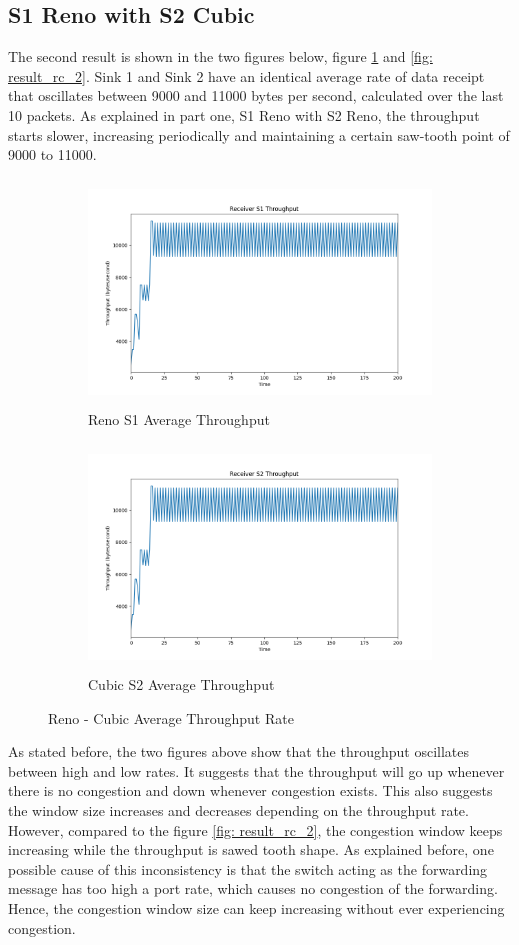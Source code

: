 \documentclass[12pt,a4paper]{report}
\begin{document}
\subsection*{S1 Reno with S2 Cubic}
The second result is shown in the two figures below, figure \ref{fig: result_rc_1} and \ref{fig: result_rc_2}.  Sink 1 and Sink 2 have an identical average rate of data receipt that oscillates between 9000 and 11000 bytes per second, calculated over the last 10 packets. As explained in part one, S1 Reno with S2 Reno, the throughput starts slower, increasing periodically and maintaining a certain saw-tooth point of 9000 to 11000. \\
\begin{figure}[!ht]
\begin{subfigure}{0.5\textwidth}
\includegraphics[width=1\linewidth, height=6cm]{Pictures/S1_Cubic_Throughput.png} 
\caption{Reno S1 Average Throughput}
\end{subfigure}
\begin{subfigure}{0.5\textwidth}
\includegraphics[width=1\linewidth, height=6cm]{Pictures/S2_Cubic_Throughput.png}
\caption{Cubic S2 Average Throughput}
\end{subfigure}
\caption{Reno - Cubic Average Throughput Rate}
\label{fig: result_rc_1}
\end{figure}
\break
\noindent As stated before, the two figures above show that the throughput oscillates between high and low rates. It suggests that the throughput will go up whenever there is no congestion and down whenever congestion exists. This also suggests the window size increases and decreases depending on the throughput rate. However, compared to the figure \ref{fig: result_rc_2}, the congestion window keeps increasing while the throughput is sawed tooth shape. As explained before, one possible cause of this inconsistency is that the switch acting as the forwarding message has too high a port rate, which causes no congestion of the forwarding. Hence, the congestion window size can keep increasing without ever experiencing congestion.\\
\end{document}
